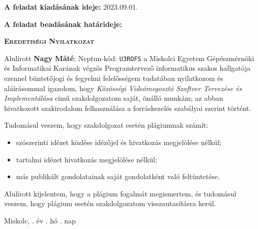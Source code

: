 \bigskip
\noindent\textbf{A feladat kiadásának ideje:} 2023.09.01.

\noindent\textbf{A feladat beadásának határideje:}

\vspace{1.5cm}

\hfill\makebox[6cm]{\dotfill}

\hfill{}

\clearpage

\vspace*{1cm}
\begin{center}
    \large\textsc{\textbf{Eredetiségi Nyilatkozat}}
\end{center}
\vspace*{2cm}

Alulírott \textbf{Nagy Máté}; Neptun-kód: \texttt{U3ROFS} a Miskolci Egyetem Gépészmérnöki és Informatikai Karának végzős Programtervező informatikus szakos hallgatója ezennel büntetőjogi és fegyelmi felelősségem tudatában nyilatkozom és aláírásommal igazolom, hogy \textit{Közösségi Videómegosztó Szoftver Tervezése és Implementálása}
című szakdolgozatom saját, önálló munkám; az abban hivatkozott szakirodalom
felhasználása a forráskezelés szabályai szerint történt.

\medskip
Tudomásul veszem, hogy szakdolgozat esetén plágiumnak számít:
\begin{itemize}
    \item szószerinti idézet közlése idézőjel és hivatkozás megjelölése nélkül;
    \item tartalmi idézet hivatkozás megjelölése nélkül;
    \item más publikált gondolatainak saját gondolatként való feltüntetése.
\end{itemize}

Alulírott kijelentem, hogy a plágium fogalmát megismertem, és tudomásul veszem, hogy
plágium esetén szakdolgozatom visszautasításra kerül.

\vspace*{3cm}

\noindent Miskolc, \makebox[2cm]{\dotfill}. év \makebox[2cm]{\dotfill}. hó \makebox[2cm]{\dotfill}. nap

\vspace*{3cm}

\hfill\makebox[6cm]{\dotfill}

\hfill{}



\clearpage


